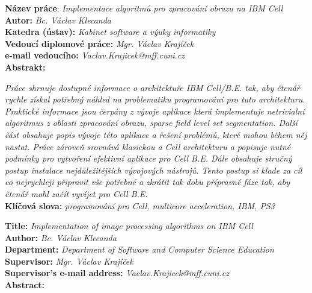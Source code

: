 \raggedbottom


\noindent
\textbf{Název práce}: \textit{Implementace algoritmů pro zpracování obrazu na IBM Cell} \\
\textbf{Autor:} \textit{Bc. Václav Klecanda} \\
\textbf{Katedra (ústav):} \textit{Kabinet software a výuky informatiky} \\
\textbf{Vedoucí diplomové práce:} \textit{Mgr. Václav Krajíček} \\
\textbf{e-mail vedoucího:} \textit{Vaclav.Krajicek@mff.cuni.cz} \\
\textbf{Abstrakt:} \\

\par
\textit{
Práce shrnuje dostupné informace o architektuře IBM Cell/B.E. tak, aby čtenář rychle získal potřebný náhled na problematiku programování pro tuto architekturu.
Praktické informace jsou čerpány z vývoje aplikace která implementuje netrivialní algoritmus z oblasti zpracování obrazu, sparse field level set segmentation.
Další část obsahuje popis vývoje této aplikace a řešení problémů, které mohou během něj nastat.
Práce zároveň srovnává klasickou a Cell architekturu a popisuje nutné podmínky pro vytvoření efektivní aplikace pro Cell B.E.
Dále obsahuje stručný postup instalace nejdůležitějších vývojových nástrojů.
Tento postup si klade za cíl co nejrychleji připravit vše potřebné a zkrátit tak dobu přípravné fáze tak, aby čtenář mohl začít vyvíjet pro Cell B.E.
}\\

\noindent
\textbf{Klíčová slova:} \textit{programování pro Cell, multicore acceleration, IBM, PS3} \\

\pagebreak


\noindent
\textbf{Title:} \textit{Implementation of image processing algorithms on IBM Cell} \\
\textbf{Author:} \textit{Bc. Václav Klecanda} \\
\textbf{Department:} \textit{Department of Software and Computer Science Education} \\
\textbf{Supervisor:} \textit{Mgr. Václav Krajíček} \\
\textbf{Supervisor's e-mail address:} \textit{Vaclav.Krajicek@mff.cuni.cz} \\
\textbf{Abstract:} \\


